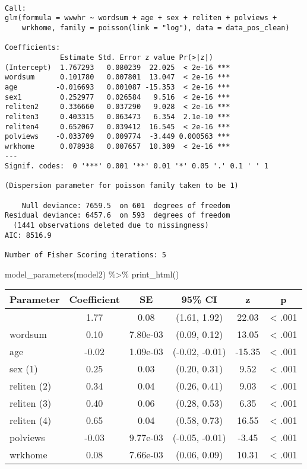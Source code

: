 \documentclass[
  letterpaper,
  DIV=11,
  numbers=noendperiod]{scrartcl}
\newenvironment{Shaded}{\begin{snugshade}}{\end{snugshade}}
\newcommand{\FunctionTok}[1]{\textcolor[rgb]{0.28,0.35,0.67}{#1}}
\newcommand{\NormalTok}[1]{\textcolor[rgb]{0.00,0.23,0.31}{#1}}
\newcommand{\SpecialCharTok}[1]{\textcolor[rgb]{0.37,0.37,0.37}{#1}}
\begin{document}
\begin{verbatim}

Call:
glm(formula = wwwhr ~ wordsum + age + sex + reliten + polviews + 
    wrkhome, family = poisson(link = "log"), data = data_pos_clean)

Coefficients:
             Estimate Std. Error z value Pr(>|z|)    
(Intercept)  1.767293   0.080239  22.025  < 2e-16 ***
wordsum      0.101780   0.007801  13.047  < 2e-16 ***
age         -0.016693   0.001087 -15.353  < 2e-16 ***
sex1         0.252977   0.026584   9.516  < 2e-16 ***
reliten2     0.336660   0.037290   9.028  < 2e-16 ***
reliten3     0.403315   0.063473   6.354  2.1e-10 ***
reliten4     0.652067   0.039412  16.545  < 2e-16 ***
polviews    -0.033709   0.009774  -3.449 0.000563 ***
wrkhome      0.078938   0.007657  10.309  < 2e-16 ***
---
Signif. codes:  0 '***' 0.001 '**' 0.01 '*' 0.05 '.' 0.1 ' ' 1

(Dispersion parameter for poisson family taken to be 1)

    Null deviance: 7659.5  on 601  degrees of freedom
Residual deviance: 6457.6  on 593  degrees of freedom
  (1441 observations deleted due to missingness)
AIC: 8516.9

Number of Fisher Scoring iterations: 5
\end{verbatim}

\begin{Shaded}
\begin{Highlighting}[]
\FunctionTok{model\_parameters}\NormalTok{(model2) }\SpecialCharTok{\%\textgreater{}\%}
  \FunctionTok{print\_html}\NormalTok{()}
\end{Highlighting}
\end{Shaded}

\begin{table}
\fontsize{12.0pt}{14.4pt}\selectfont
\begin{tabular*}{\linewidth}{@{\extracolsep{\fill}}lccccc}
\toprule
Parameter & Coefficient & SE & 95\% CI & z & p \\ 
\midrule\addlinespace[2.5pt]
{(Intercept)} & 1.77 & 0.08 & (1.61, 1.92) & 22.03 & < .001 \\ 
{wordsum} & 0.10 & 7.80e-03 & (0.09, 0.12) & 13.05 & < .001 \\ 
{age} & -0.02 & 1.09e-03 & (-0.02, -0.01) & -15.35 & < .001 \\ 
{sex (1)} & 0.25 & 0.03 & (0.20, 0.31) & 9.52 & < .001 \\ 
{reliten (2)} & 0.34 & 0.04 & (0.26, 0.41) & 9.03 & < .001 \\ 
{reliten (3)} & 0.40 & 0.06 & (0.28, 0.53) & 6.35 & < .001 \\ 
{reliten (4)} & 0.65 & 0.04 & (0.58, 0.73) & 16.55 & < .001 \\ 
{polviews} & -0.03 & 9.77e-03 & (-0.05, -0.01) & -3.45 & < .001 \\ 
{wrkhome} & 0.08 & 7.66e-03 & (0.06, 0.09) & 10.31 & < .001 \\ 
\bottomrule
\end{tabular*}
\begin{minipage}{\linewidth}
\\
\end{minipage}
\end{table}
\end{document}
